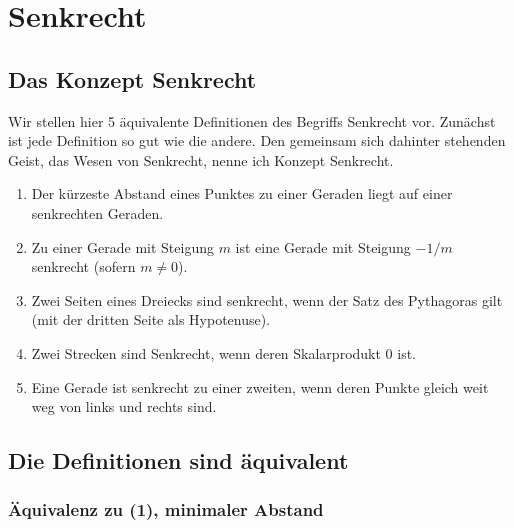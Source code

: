 \documentclass[a4paper]{amsart}
\theoremstyle{definition}
\begin{document}
\section{Senkrecht}

\subsection{Das Konzept Senkrecht}
Wir stellen hier 5 äquivalente Definitionen des Begriffs Senkrecht vor. Zunächst ist jede Definition so gut wie die andere. Den gemeinsam sich dahinter stehenden Geist, das Wesen von Senkrecht, nenne ich Konzept Senkrecht.

\begin{enumerate}
   \item Der kürzeste Abstand eines Punktes zu einer Geraden liegt auf einer senkrechten Geraden.
   \item Zu einer Gerade mit Steigung $m$ ist eine Gerade mit Steigung $-1/m$ senkrecht (sofern $m \ne 0$).
   \item Zwei Seiten eines Dreiecks sind senkrecht, wenn der Satz des Pythagoras gilt (mit der dritten Seite als Hypotenuse).
   \item Zwei Strecken sind Senkrecht, wenn deren Skalarprodukt 0 ist.
   \item Eine Gerade ist senkrecht zu einer zweiten, wenn deren Punkte gleich weit weg von links und rechts sind.
\end{enumerate}

\subsection{Die Definitionen sind äquivalent}
\subsubsection{Äquivalenz zu (1), minimaler Abstand}
\end{document}
